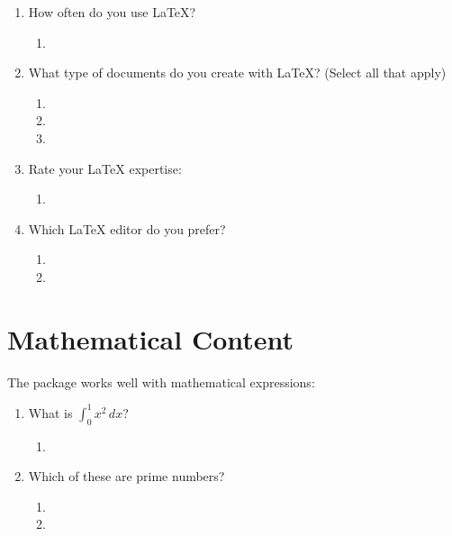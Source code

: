 \documentclass[11pt]{article}
\begin{document}
\begin{enumerate}[mainq]
  \item How often do you use LaTeX?
  \begin{enumerate}[subq]
    \item {}
  \end{enumerate}

\setenumsublabelwidth{2.2em}
\setenumsubitemwidth{3cm}
  
  \item What type of documents do you create with LaTeX? (Select all that apply)
  \begin{enumerate}[subq]
    \item {}
    \item {}
    \item {}
  \end{enumerate}
  
  \item Rate your LaTeX expertise:
  \begin{enumerate}[subq]
    \item {}
  \end{enumerate}
  
  \item Which LaTeX editor do you prefer?
  \begin{enumerate}[subq]
    \item {}
    \item {}
  \end{enumerate}
\end{enumerate}

\section{Mathematical Content}

The package works well with mathematical expressions:

\begin{enumerate}[mainq]
  \item What is $\int_0^1 x^2 \, dx$?
  \begin{enumerate}[subq]
    \item {}
  \end{enumerate}
  
  \item Which of these are prime numbers?
  \begin{enumerate}[subq]
    \item {}
    \item {}
  \end{enumerate}
\end{enumerate}
\end{document}
